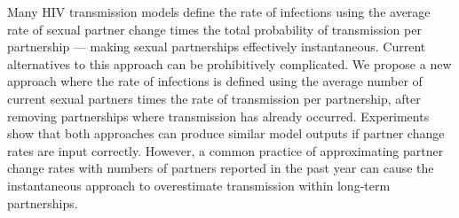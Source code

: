 Many HIV transmission models define the rate of infections using %
the average rate of sexual partner change times
the total probability of transmission per partnership
--- making sexual partnerships effectively instantaneous.
Current alternatives to this approach can be prohibitively complicated.
We propose a new approach where the rate of infections is defined using
the average number of current sexual partners times
the rate of transmission per partnership,
after removing partnerships where transmission has already occurred.
Experiments show that both approaches can produce similar model outputs
if partner change rates are input correctly. %
However, a common practice of approximating partner change rates  
with numbers of partners reported in the past year
can cause the instantaneous approach to overestimate
transmission within long-term partnerships. %
